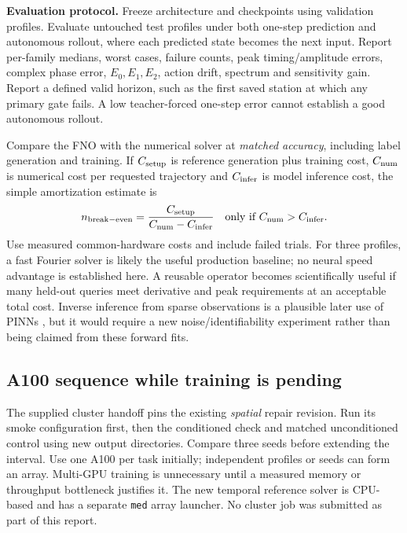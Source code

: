 \textbf{Evaluation protocol.} Freeze architecture and checkpoints using validation profiles. Evaluate untouched test profiles under both one-step prediction and autonomous rollout, where each predicted state becomes the next input. Report per-family medians, worst cases, failure counts, peak timing/amplitude errors, complex phase error, $E_0,E_1,E_2$, action drift, spectrum and sensitivity gain. Report a defined valid horizon, such as the first saved station at which any primary gate fails. A low teacher-forced one-step error cannot establish a good autonomous rollout.

Compare the FNO with the numerical solver at \emph{matched accuracy}, including label generation and training. If $C_{\rm setup}$ is reference generation plus training cost, $C_{\rm num}$ is numerical cost per requested trajectory and $C_{\rm infer}$ is model inference cost, the simple amortization estimate is
\[
 n_{\rm break-even}=\frac{C_{\rm setup}}{C_{\rm num}-C_{\rm infer}}
 \quad\text{only if }C_{\rm num}>C_{\rm infer}.
\]
Use measured common-hardware costs and include failed trials. For three profiles, a fast Fourier solver is likely the useful production baseline; no neural speed advantage is established here. A reusable operator becomes scientifically useful if many held-out queries meet derivative and peak requirements at an acceptable total cost. Inverse inference from sparse observations is a plausible later use of PINNs \cite{raissi}, but it would require a new noise/identifiability experiment rather than being claimed from these forward fits.

\subsection{A100 sequence while training is pending}
The supplied cluster handoff pins the existing \emph{spatial} repair revision. Run its smoke configuration first, then the conditioned check and matched unconditioned control using new output directories. Compare three seeds before extending the interval. Use one A100 per task initially; independent profiles or seeds can form an array. Multi-GPU training is unnecessary until a measured memory or throughput bottleneck justifies it. The new temporal reference solver is CPU-based and has a separate \texttt{med} array launcher. No cluster job was submitted as part of this report.
